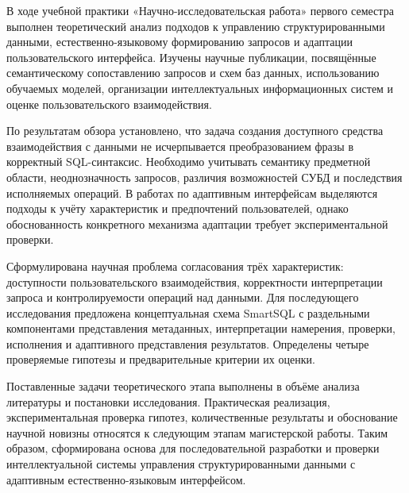 
В ходе учебной практики «Научно-исследовательская работа» первого семестра выполнен теоретический анализ подходов к управлению структурированными данными, естественно-языковому формированию запросов и адаптации пользовательского интерфейса. Изучены научные публикации, посвящённые семантическому сопоставлению запросов и схем баз данных, использованию обучаемых моделей, организации интеллектуальных информационных систем и оценке пользовательского взаимодействия.

По результатам обзора установлено, что задача создания доступного средства взаимодействия с данными не исчерпывается преобразованием фразы в корректный SQL-синтаксис. Необходимо учитывать семантику предметной области, неоднозначность запросов, различия возможностей СУБД и последствия исполняемых операций. В работах по адаптивным интерфейсам выделяются подходы к учёту характеристик и предпочтений пользователей, однако обоснованность конкретного механизма адаптации требует экспериментальной проверки.

Сформулирована научная проблема согласования трёх характеристик: доступности пользовательского взаимодействия, корректности интерпретации запроса и контролируемости операций над данными. Для последующего исследования предложена концептуальная схема SmartSQL с раздельными компонентами представления метаданных, интерпретации намерения, проверки, исполнения и адаптивного представления результатов. Определены четыре проверяемые гипотезы и предварительные критерии их оценки.

Поставленные задачи теоретического этапа выполнены в объёме анализа литературы и постановки исследования. Практическая реализация, экспериментальная проверка гипотез, количественные результаты и обоснование научной новизны относятся к следующим этапам магистерской работы. Таким образом, сформирована основа для последовательной разработки и проверки интеллектуальной системы управления структурированными данными с адаптивным естественно-языковым интерфейсом.